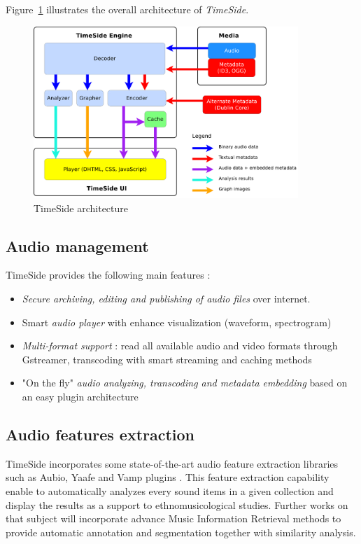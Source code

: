 \documentclass[runningheads,a4paper]{llncs}
\begin{document}
Figure~\ref{fig:TimeSide_Archi} illustrates the overall architecture of \emph{TimeSide}.

\begin{figure}[htbp]
  \centering
  \includegraphics[width=10cm]{img/timeside_schema.pdf}
  \caption{TimeSide architecture}\label{fig:TimeSide_Archi}
\end{figure}


\subsection{Audio management}
TimeSide provides the following main features :
\begin{itemize}
\item \emph{Secure archiving, editing and publishing of audio files} over
  internet.
\item Smart \emph{audio player} with enhance visualization (waveform, spectrogram)
\item \emph{Multi-format support} : read all available audio and video formats  through Gstreamer, transcoding with smart streaming and caching methods%
\item "On the fly" \emph{audio analyzing, transcoding and metadata
    embedding} based on an easy plugin architecture
\end{itemize}

\subsection{Audio features extraction}
TimeSide incorporates some state-of-the-art audio feature extraction libraries such as Aubio, Yaafe and Vamp plugins \cite{brossierPhD,yaafe_ISMIR2010,vamp-plugins}.
This feature extraction capability enable to automatically analyzes every sound items in a given collection and display the results as a support to ethnomusicological studies.
Further works on that subject will incorporate advance Music Information Retrieval methods to provide automatic annotation and segmentation together with similarity analysis.
\end{document}
